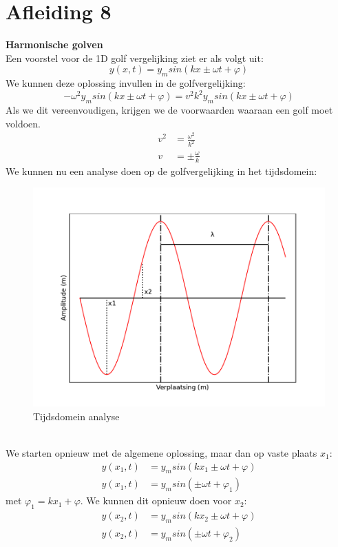\documentclass[a4paper,kul]{kulakarticle} %
\begin{document}
\section{Afleiding 8}
\textbf{Harmonische golven}\\
Een voorstel voor de 1D golf vergelijking ziet er als volgt uit:
\begin{equation*}
	y(x,t) = y_msin(kx \pm \omega t +\varphi)
\end{equation*}
We kunnen deze oplossing invullen in de golfvergelijking:
\begin{equation*}
	-\omega^2y_msin(kx \pm \omega t +\varphi)=v^2k^2y_msin(kx \pm \omega t +\varphi)
\end{equation*}
Als we dit vereenvoudigen, krijgen we de voorwaarden waaraan een golf moet voldoen.
\begin{align*}
	v^2 & = \frac{\omega^2}{k^2}\\
	v & = \pm\frac{\omega}{k}
\end{align*}
We kunnen nu een analyse doen op de golfvergelijking in het tijdsdomein:\\
\begin{figure}[h]
	\centering
	\includegraphics[width=0.7\linewidth]{tijdsdomein_analyse}
	\caption[Tijdsdomein analyse]{Tijdsdomein analyse}
	\label{fig:tijdsdomein}
\end{figure}\\
We starten opnieuw met de algemene oplossing, maar dan op vaste plaats $x_1$:
\begin{align}
	y(x_1,t) &= y_msin(kx_1 \pm \omega t +\varphi)\\
	\label{eq:tijdsanalyse1}
	y(x_1,t) &= y_msin(\pm \omega t +\varphi_1)
\end{align}
met $\varphi_1 = kx_1 +\varphi$. We kunnen dit opnieuw doen voor $x_2$:
\begin{align}
	y(x_2,t) &= y_msin(kx_2 \pm \omega t +\varphi)\\
	\label{eq:tijdsanalyse2}
	y(x_2,t) &= y_msin(\pm \omega t +\varphi_2)
\end{align}
\end{document}
